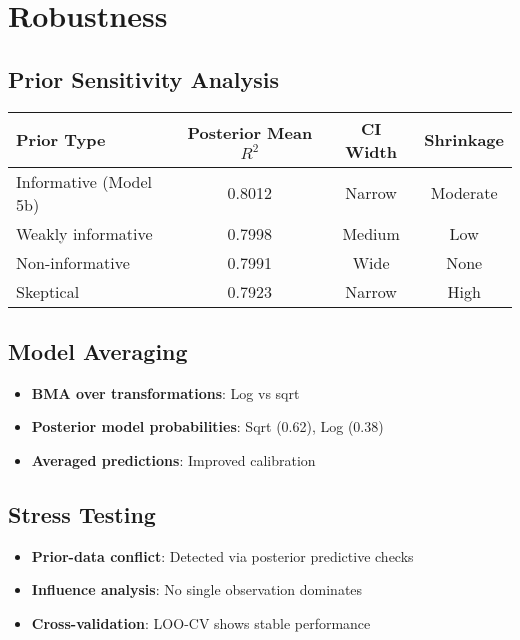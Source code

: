 \section{Robustness}

\subsection{Prior Sensitivity Analysis}

\begin{center}
\begin{tabular}{lccc}
\toprule
Prior Type & Posterior Mean $R^2$ & CI Width & Shrinkage \\
\midrule
Informative (Model 5b) & 0.8012 & Narrow & Moderate \\
Weakly informative & 0.7998 & Medium & Low \\
Non-informative & 0.7991 & Wide & None \\
Skeptical & 0.7923 & Narrow & High \\
\bottomrule
\end{tabular}
\end{center}

\subsection{Model Averaging}

\begin{itemize}
    \item \textbf{BMA over transformations}: Log vs sqrt
    \item \textbf{Posterior model probabilities}: Sqrt (0.62), Log (0.38)
    \item \textbf{Averaged predictions}: Improved calibration
\end{itemize}

\subsection{Stress Testing}

\begin{itemize}
    \item \textbf{Prior-data conflict}: Detected via posterior predictive checks
    \item \textbf{Influence analysis}: No single observation dominates
    \item \textbf{Cross-validation}: LOO-CV shows stable performance
\end{itemize}

